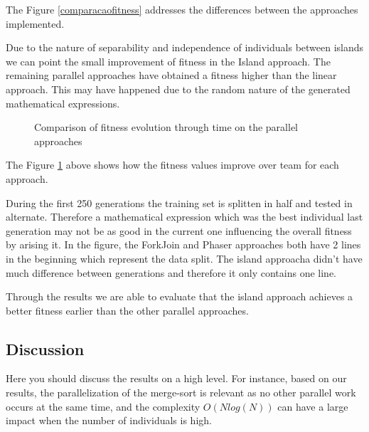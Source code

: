 \documentclass[runningheads]{llncs}
\begin{document}
The Figure \ref{comparacaofitness} addresses the differences between the approaches implemented.

Due to the nature of separability and independence of individuals between islands \cite{islandModelGA} we can point the small improvement of fitness in the Island approach.
The remaining parallel approaches have obtained a fitness higher than the linear approach. This may have happened due to the random nature of the generated mathematical expressions.


\begin{figure}[H]
\centering
{}
\caption{Comparison of fitness evolution through time on the parallel approaches} \label{comparacaoLinhas}
\end{figure}

The Figure \ref{comparacaoLinhas} above shows how the fitness values improve over team for each approach.

During the first 250 generations the training set is splitten in half and tested in alternate. Therefore a mathematical expression which was the best individual last generation may not be as good in the current one influencing the overall fitness by arising it. In the figure, the ForkJoin and Phaser approaches both have 2 lines in the beginning which represent the data split. The island approacha didn't have much difference between generations and therefore it only contains one line.

Through the results we are able to evaluate that the island approach achieves a better fitness earlier than the other parallel approaches.

\subsection{Discussion}

Here you should discuss the results on a high level. For instance, based on our results, the parallelization of the merge-sort is relevant as no other parallel work occurs at the same time, and the complexity $O(N log(N))$ can have a large impact when the number of individuals is high.
\end{document}
